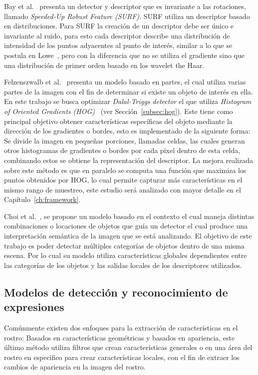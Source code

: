 Bay et al.~\cite{surf2008} presenta un detector y descriptor que es invariante a las rotaciones, llamado \textit{Speeded-Up Robust Feature (SURF)}. SURF utiliza un descriptor basado en distribuciones. Para SURF la creación de un descriptor debe ser único e invariante al ruido, para esto cada descriptor describe una distribución de intensidad de los puntos adyacentes al punto de interés, similar a lo que se postula en Lowe~\cite{sift2004}, pero con la diferencia que no se utiliza el gradiente sino que una distribución de primer orden basado en los wavelet the Haar.

Felzenszwalb et al.~\cite{Felzenszwalb2010} presenta un modelo basado en partes,  el cual utiliza varias partes de la imagen con el fin de determinar si existe un objeto de interés en ella. En este trabajo se busca optimizar \textit{Dalal-Triggs detector} el que utiliza \textit{Histogram of Oriented Gradients (HOG)}~\cite{hog2005} (ver Sección~\ref{subsec:hog}). Este tiene como principal objetivo obtener características específicas del objeto mediante la dirección de los gradientes o bordes, esto es implementado de la siguiente forma: Se divide la imagen en pequeñas porciones, llamadas celdas, las cuales generan otros histogramas de gradientes o bordes por cada pixel dentro de esta celda, combinando estos se obtiene la representación del descriptor. La mejora realizada sobre este método es que en paralelo se computa una función que maximiza los puntos obtenidos por HOG, lo cual permite capturar más características en el mismo rango de muestreo, este estudio será analizado con mayor detalle en el Capítulo~\ref{ch:framework}.

Choi et al.~\cite{treebased2012}, se propone un modelo basado en el contexto el cual maneja distintas combinaciones o locaciones de objetos que guía un detector el cual produce una interpretación semántica de la imagen que se está analizando. El objetivo de este trabajo es poder detectar múltiples categorías de objetos dentro de una misma escena. Por lo cual su modelo utiliza características globales dependientes entre las categorías de los objetos y las salidas locales de los descriptores utilizados.

\subsection{Modelos de detección y reconocimiento de expresiones}
Comúnmente existen dos enfoques para la extracción de características en el rostro: Basados en características geométricas y basados en apariencia, este último método utiliza filtros que crean características generales o en una área del rostro en especifico para crear características locales, con el fin de extraer los cambios de apariencia en la imagen del rostro.

